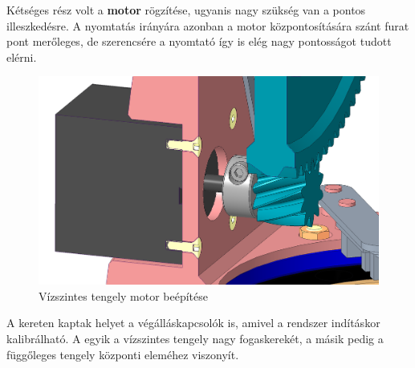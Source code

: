 \documentclass[12pt,a4paper]{article}
\begin{document}
Kétséges rész volt a \textbf{motor} rögzítése, ugyanis nagy szükség van a pontos illeszkedésre. A nyomtatás irányára azonban a motor központosítására szánt furat pont merőleges, de szerencsére a nyomtató így is elég nagy pontosságot tudott elérni.

\begin{figure}[h!]
	\centering
	\includegraphics[width=1 \linewidth]{mech_motorbeepites}
	\caption{Vízszintes tengely motor beépítése}
	\label{fig:mech_motorbeepites}
\end{figure}

A kereten kaptak helyet a végálláskapcsolók is, amivel a rendszer indításkor kalibrálható. A egyik a vízszintes tengely nagy fogaskerekét, a másik pedig a függőleges tengely központi eleméhez viszonyít.
\end{document}
